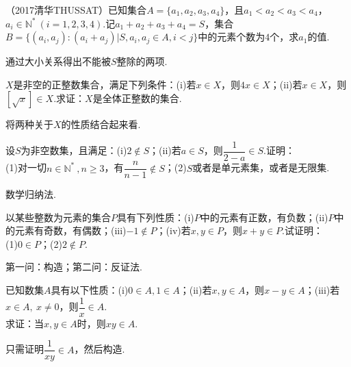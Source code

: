 \documentclass[lang=cn, zihao=4.5]{elegantbook}
\begin{document}
\begin{example} %
	（2017清华THUSSAT）已知集合$A= \{ a_1,a_2,a_3,a_4 \}$，且$a_1 < a_2 < a_3 < a_4$，$a_i \in \mathbb{N} ^* ~(i=1,2,3,4)$.记$a_1+a_2+a_3+a_4=S$，集合$B = \{ (a_i,a_j) : (a_i+a_j) | S, a_i,a_j \in A, i<j \}$中的元素个数为$4$个，求$a_1$的值.
\end{example}
\begin{hint}
	通过大小关系得出不能被$S$整除的两项.
\end{hint}

\begin{example} %
	$X$是非空的正整数集合，满足下列条件：(i)若$x \in X$，则$4x \in X$；(ii)若$x \in X$，则$[\sqrt{x}] \in X$.求证：$X$是全体正整数的集合.
\end{example}
\begin{hint}
	将两种关于$X$的性质结合起来看.
\end{hint}

\begin{example} %
	设$S$为非空数集，且满足：(i)$2 \notin S$；(ii)若$a \in S$，则$\dfrac{1}{2-a} \in S$.证明： \\
	(1)对一切$n \in \mathbb{N} ^{*} ~, n \geq 3$，有$\dfrac{n}{n-1} \notin S$；(2)$S$或者是单元素集，或者是无限集.
\end{example}
\begin{hint}
	数学归纳法.
\end{hint}

\begin{example} %
	以某些整数为元素的集合$P$具有下列性质：(i)$P$中的元素有正数，有负数；(ii)$P$中的元素有奇数，有偶数；(iii)$-1 \notin P$；(iv)若$x,y \in P$，则$x+y \in P$.试证明： \\
	(1)$0 \in P$；(2)$2 \notin P$.
\end{example}
\begin{hint}
	第一问：构造；第二问：反证法.
\end{hint}

\begin{example} %
	已知数集$A$具有以下性质：(i)$0 \in A,1 \in A$；(ii)若$x,y \in A$，则$x-y \in A$；(iii)若$x \in A, ~x \neq 0$，则$\dfrac{1}{x} \in A$. \\
	求证：当$x,y \in A$时，则$xy \in A$.
\end{example}
\begin{hint}
	只需证明$\dfrac{1}{xy} \in A$，然后构造.
\end{hint}
\end{document}
